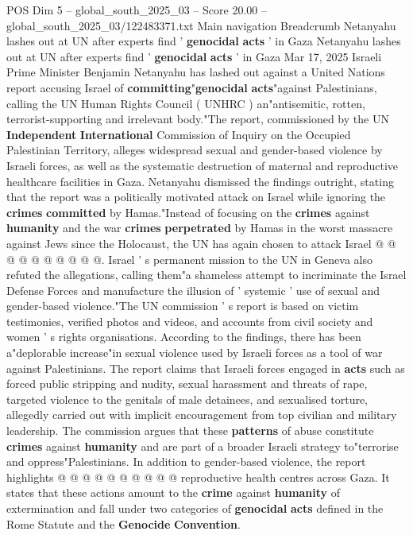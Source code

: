 \begin{textsample}{POS Dim 5 – global\_south\_2025\_03 – Score 20.00 – global\_south\_2025\_03/122483371.txt}  \label{ex:f5_pos_181}
Main navigation Breadcrumb Netanyahu lashes out at UN after experts find ' \textbf{genocidal} \textbf{acts} ' in Gaza Netanyahu lashes out at UN after experts find ' \textbf{genocidal} \textbf{acts} ' in Gaza Mar 17, 2025 Israeli Prime Minister Benjamin Netanyahu has lashed out against a United Nations report accusing Israel of \textbf{committing}"\textbf{genocidal} \textbf{acts}"against Palestinians, calling the UN Human Rights Council ( UNHRC ) an"antisemitic, rotten, terrorist-supporting and irrelevant body."The report, commissioned by the UN \textbf{Independent} \textbf{International} Commission of Inquiry on the Occupied Palestinian Territory, alleges widespread sexual and gender-based violence by Israeli forces, as well as the systematic destruction of maternal and reproductive healthcare facilities in Gaza.
Netanyahu dismissed the findings outright, stating that the report was a politically motivated attack on Israel while ignoring the \textbf{crimes} \textbf{committed} by Hamas."Instead of focusing on the \textbf{crimes} against \textbf{humanity} and the war \textbf{crimes} \textbf{perpetrated} by Hamas in the worst massacre against Jews since the Holocaust, the UN has again chosen to attack Israel @ @ @ @ @ @ @ @ @ @.
Israel ' s permanent mission to the UN in Geneva also refuted the allegations, calling them"a shameless attempt to incriminate the Israel Defense Forces and manufacture the illusion of ' systemic ' use of sexual and gender-based violence."The UN commission ' s report is based on victim testimonies, verified photos and videos, and accounts from civil society and women ' s rights organisations.
According to the findings, there has been a"deplorable increase"in sexual violence used by Israeli forces as a tool of war against Palestinians.
The report claims that Israeli forces engaged in \textbf{acts} such as forced public stripping and nudity, sexual harassment and threats of rape, targeted violence to the genitals of male detainees, and sexualised torture, allegedly carried out with implicit encouragement from top civilian and military leadership.
The commission argues that these \textbf{patterns} of abuse constitute \textbf{crimes} against \textbf{humanity} and are part of a broader Israeli strategy to"terrorise and oppress"Palestinians.
In addition to gender-based violence, the report highlights @ @ @ @ @ @ @ @ @ @ reproductive health centres across Gaza.
It states that these actions amount to the \textbf{crime} against \textbf{humanity} of extermination and fall under two categories of \textbf{genocidal} \textbf{acts} defined in the Rome Statute and the \textbf{Genocide} \textbf{Convention}.

\end{textsample}
